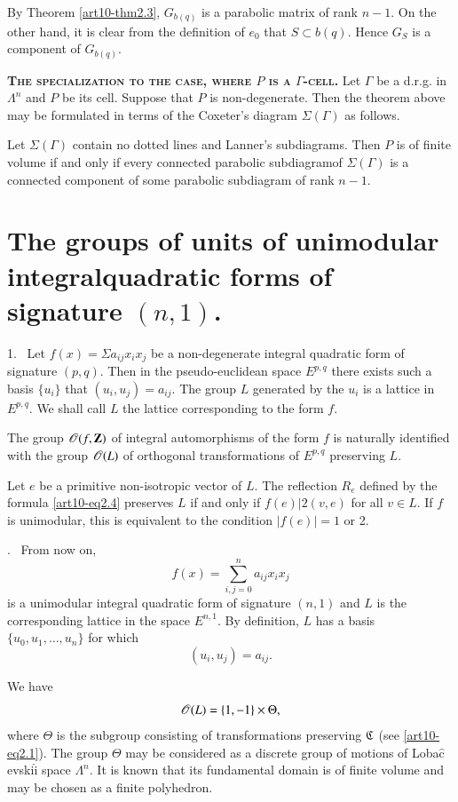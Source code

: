 By Theorem \ref{art10-thm2.3}, $G_{b(q)}$ is a parabolic matrix of rank $n-1$. On the other hand, it is clear from the definition of $e_0$ that $S \subset b(q)$. Hence $G_S$ is a component of $G_{b(q)}$.

\medskip
\textbf{\textsc{The specialization to the case, where $P$ is a $\Gamma$-cell.}} Let $\Gamma$ be a d.r.g. in $\Lambda^n$ and $P$ be its cell. Suppose that $P$ is non-degenerate. Then the theorem above may be formulated in terms of the Coxeter's diagram $\Sigma (\Gamma)$ as follows.

\setcounter{theorem}{5}
\begin{theorembis}\label{art10-thmbis2.6}
Let $\Sigma (\Gamma)$ contain no dotted lines and Lanner's subdiagrams. Then $P$ is of finite volume if and only if every connected parabolic subdiagram\pageoriginale of $\Sigma (\Gamma)$ is a connected component of some para\-bolic subdiagram of rank $n -1$.
\end{theorembis}

\section{The groups of units of unimodular integral\break quadratic forms of signature $(n,1)$.}\label{art10-sec3}

1.~ Let $f(x) = \Sigma a_{ij} x_i x_j$ be a non-degenerate integral quadratic form of signature $(p,q)$. Then in the pseudo-euclidean space $E^{p,q}$ there exists such a basis $\{u_i\}$ that $(u_i, u_j) = a_{ij}$. The group $L$ generated by the $u_i$ is a lattice in $E^{p,q}$. We shall call $L$ the lattice corresponding to the form $f$.

The group $\mathscr{O}(f,\mathbf{Z})$ of integral automorphisms of the form $f$ is naturally identified with the group $\mathscr{O}(L)$ of orthogonal transformations of $E^{p,q}$ preserving $L$.

Let $e$ be a primitive non-isotropic vector of $L$. The reflection $R_e$ defined by the formula \eqref{art10-eq2.4} preserves $L$ if and only if $f(e) \big| 2(v,e)$ for all $v \in L$. If $f$ is unimodular, this is equivalent to the condition $|f(e)| = 1$ or 2. 

.~ From now on,
$$
f(x) = \sum\limits^n_{i, j =0} a_{ij} x_i x_j
$$
is a unimodular integral quadratic form of signature $(n,1)$ and $L$ is the corresponding lattice in the space $E^{n,1}$. By definition, $L$ has a basis $\{u_0, u_1, \ldots, u_n\}$ for which
$$
(u_i, u_j) = a_{ij}.
$$

We have 
$$
\mathscr{O}(L) = \{1, -1\} \times \Theta,
$$
where $\Theta$ is the subgroup consisting of transformations preserving $\mathfrak{C}$ (see \ref{art10-eq2.1}). The group $\Theta$ may be considered as a discrete group of motions of Loba$\hat{\text{c}}$evski$\hat{\text{i}}$ space $\Lambda^n$. It is known \cite{art10-key2} that its fundamental domain is of finite volume and may be chosen as a finite polyhedron.

